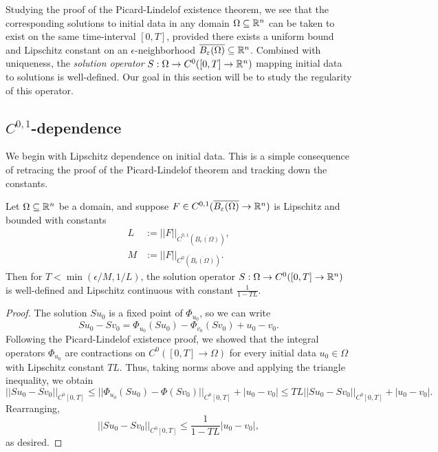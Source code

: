 Studying the proof of the Picard-Lindelof existence theorem, we see that the corresponding solutions to initial data in any domain $\Omega \subseteq \mathbb R^n$ can be taken to exist on the same time-interval $[0, T]$, provided there exists a uniform bound and Lipschitz constant on an $\epsilon$-neighborhood $\overline{B_\varepsilon (\Omega)} \subseteq \mathbb R^n$. Combined with uniqueness, the \emph{solution operator} $S : \Omega \to C^0 ([0, T] \to \mathbb R^n)$ mapping initial data to solutions is well-defined. Our goal in this section will be to study the regularity of this operator. 



\subsection{$C^{0, 1}$-dependence}

We begin with Lipschitz dependence on initial data. This is a simple consequence of retracing the proof of the Picard-Lindelof theorem and tracking down the constants. 

\begin{theorem}
	Let $\Omega \subseteq \mathbb R^n$ be a domain, and suppose $F \in C^{0, 1}(\overline{B_\varepsilon (\Omega)} \to \mathbb R^n)$ is Lipschitz and bounded with constants
		\begin{align*}
			L &:= ||F||_{\dot C^{0, 1} (\overline{B_\epsilon (\Omega)})}, \\
			M &:= ||F||_{C^{0} (\overline{B_\epsilon (\Omega)})}.
		\end{align*}
	Then for $T< \min (\epsilon/M, 1/L)$, the solution operator $S : \Omega \to C^0 ([0, T] \to \mathbb R^n)$	 is well-defined and Lipschitz continuous with constant $\frac{1}{1 - TL}$.
\end{theorem}

\begin{proof}
	The solution $S u_0$ is a fixed point of $\Phi_{u_0}$, so we can write
		\[ S u_0 - Sv_0 = \Phi_{u_0} (S u_0) - \Phi_{v_0} (S v_0) + u_0 - v_0. \]
	Following the Picard-Lindelof existence proof, we showed that the integral operators $\Phi_{u_0}$ are contractions on $C^0([0, T] \to \Omega)$ for every initial data $u_0 \in \Omega$ with Lipschitz constant $TL$. Thus, taking norms above and applying the triangle inequality, we obtain 
		\[ || Su_0 - Sv_0||_{C^0 [0, T]} \leq ||\Phi_{u_0} (Su_0) - \Phi(S v_0)||_{C^0 [0, T]} + |u_0 - v_0| \leq  TL || Su_0 - Sv_0||_{C^0 [0, T]} + |u_0 - v_0|.\]
	Rearranging, 
		\[ || Su_0 - Sv_0||_{C^0 [0, T]} \leq \frac{1}{1 - TL} |u_0 - v_0|,  \]
	as desired. 		
\end{proof}

